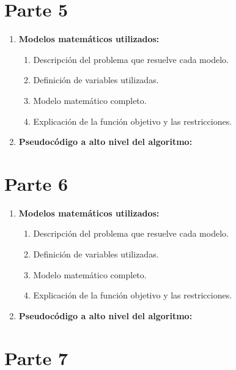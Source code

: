 \documentclass[a4paper,12pt]{article}
\begin{document}
\clearpage

\section{Parte 5}
\label{sec:variante5}

\begin{enumerate}[label=(\alph*), leftmargin=2em]
    \item \textbf{Modelos matemáticos utilizados:}
    \begin{enumerate}[label=\roman*., leftmargin=0.2em]
        \item Descripción del problema que resuelve cada modelo.
        \item Definición de variables utilizadas.
        \item Modelo matemático completo.
        \item Explicación de la función objetivo y las restricciones.
    \end{enumerate}

    \item \textbf{Pseudocódigo a alto nivel del algoritmo:}
\end{enumerate}

\clearpage

\section{Parte 6}
\label{sec:variante6}

\begin{enumerate}[label=(\alph*), leftmargin=2em]
    \item \textbf{Modelos matemáticos utilizados:}
    \begin{enumerate}[label=\roman*., leftmargin=0.2em]
        \item Descripción del problema que resuelve cada modelo.
        \item Definición de variables utilizadas.
        \item Modelo matemático completo.
        \item Explicación de la función objetivo y las restricciones.
    \end{enumerate}

    \item \textbf{Pseudocódigo a alto nivel del algoritmo:}
\end{enumerate}

\clearpage

\section{Parte 7}
\label{sec:variante5}
\end{document}
